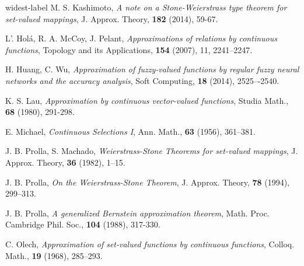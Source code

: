 \documentclass[12pt]{amsart}
\begin{document}
\begin{thebibliography}{widest-label}
 M. S. Kashimoto,
\textit{A note on a Stone-Weierstrass type theorem for set-valued mappings},
J. Approx. Theory, {\bf 182} (2014), 59-67.


 L'. Hol\'a, R. A. McCoy, J. Pelant,
\textit{Approximations of relations by continuous functions},
Topology and its Applications, \textbf{154}
(2007), 11,
2241--2247.


 H. Huang, C. Wu,
\textit{Approximation of fuzzy-valued functions by regular fuzzy neural networks and the accuracy analysis},
Soft Computing, \textbf{18}
(2014), 2525–-2540.



%

 K. S. Lau,
\textit{Approximation by continuous vector-valued functions},
Studia Math., {\bf 68} (1980), 291-298.

 E. Michael,
\textit{Continuous Selections I}, Ann. Math., {\bf 63} (1956),
361--381.


 J. B. Prolla, S. Machado,
\textit{Weierstrass-Stone Theorems for set-valued mappings},
J. Approx. Theory, {\bf 36} (1982), 1--15.

 J. B. Prolla,
\textit{On the Weierstrass-Stone Theorem},
J. Approx. Theory, {\bf 78} (1994), 299--313.

 J. B. Prolla,
\textit{A generalized Bernstein approximation theorem},
Math. Proc. Cambridge Phil. Soc., {\bf 104} (1988), 317-330.



 C. Olech,
\textit{Approximation of set-valued functions by continuous functions},
Colloq. Math., {\bf 19} (1968), 285--293.





\end{thebibliography}
\end{document}

